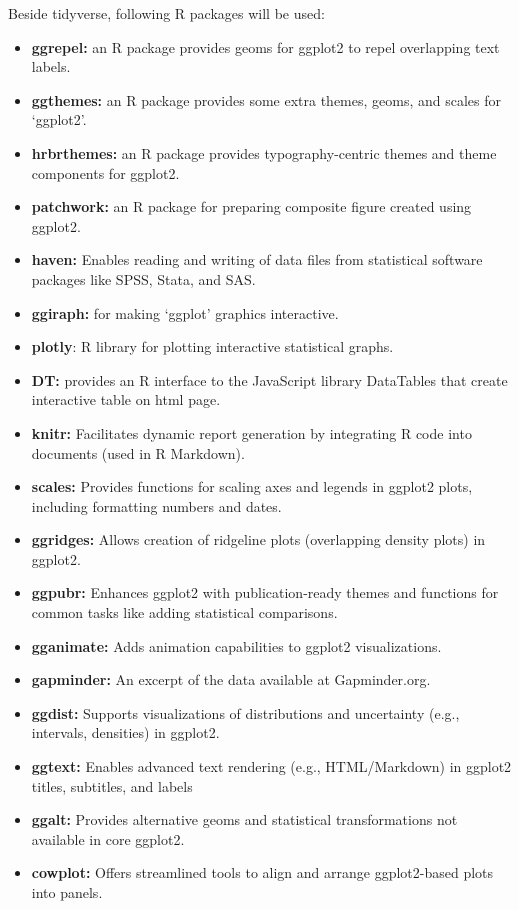 \documentclass[
  letterpaper,
  DIV=11,
  numbers=noendperiod]{scrartcl}
\begin{document}
Beside tidyverse, following R packages will be used:

\begin{itemize}
\item
  \textbf{ggrepel:} an R package provides geoms for ggplot2 to repel
  overlapping text labels.
\item
  \textbf{ggthemes:} an R package provides some extra themes, geoms, and
  scales for `ggplot2'.
\item
  \textbf{hrbrthemes:} an R package provides typography-centric themes
  and theme components for ggplot2.
\item
  \textbf{patchwork:} an R package for preparing composite figure
  created using ggplot2.
\item
  \textbf{haven:} Enables reading and writing of data files from
  statistical software packages like SPSS, Stata, and SAS.
\item
  \textbf{ggiraph:} for making `ggplot' graphics interactive.
\item
  \textbf{plotly}: R library for plotting interactive statistical
  graphs.
\item
  \textbf{DT:} provides an R interface to the JavaScript library
  DataTables that create interactive table on html page.
\item
  \textbf{knitr:} Facilitates dynamic report generation by integrating R
  code into documents (used in R Markdown).
\item
  \textbf{scales:} Provides functions for scaling axes and legends in
  ggplot2 plots, including formatting numbers and dates.
\item
  \textbf{ggridges:} Allows creation of ridgeline plots (overlapping
  density plots) in ggplot2.
\item
  \textbf{ggpubr:} Enhances ggplot2 with publication-ready themes and
  functions for common tasks like adding statistical comparisons.
\item
  \textbf{gganimate:} Adds animation capabilities to ggplot2
  visualizations.
\item
  \textbf{gapminder:} An excerpt of the data available at Gapminder.org.
\item
  \textbf{ggdist:} Supports visualizations of distributions and
  uncertainty (e.g., intervals, densities) in ggplot2.
\item
  \textbf{ggtext:} Enables advanced text rendering (e.g., HTML/Markdown)
  in ggplot2 titles, subtitles, and labels
\item
  \textbf{ggalt:} Provides alternative geoms and statistical
  transformations not available in core ggplot2.
\item
  \textbf{cowplot:} Offers streamlined tools to align and arrange
  ggplot2-based plots into panels.
\end{itemize}
\end{document}
